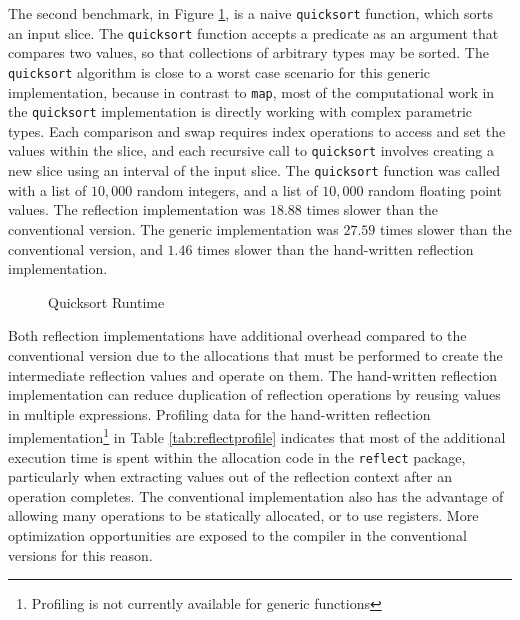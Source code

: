 \documentclass[letterpaper,11pt]{article}
\begin{document}
The second benchmark, in Figure \ref{fig:quicksort}, is a naive \texttt{quicksort} function, which sorts an input slice. The \texttt{quicksort} function accepts a predicate as an argument that compares two values, so that collections of arbitrary types may be sorted. The \texttt{quicksort} algorithm is close to a worst case scenario for this generic implementation, because in contrast to \texttt{map}, most of the computational work in the \texttt{quicksort} implementation is directly working with complex parametric types. Each comparison and swap requires index operations to access and set the values within the slice, and each recursive call to \texttt{quicksort} involves creating a new slice using an interval of the input slice. The \texttt{quicksort} function was called with a list of $10,000$ random integers, and a list of $10,000$ random floating point values. The reflection implementation was $18.88$ times slower than the conventional version. The generic implementation was $27.59$ times slower than the conventional version, and $1.46$ times slower than the hand-written reflection implementation.

\begin{figure}
    \caption{Quicksort Runtime\label{fig:quicksort}}
    \centering
    
\end{figure}

Both reflection implementations have additional overhead compared to the conventional version due to the allocations that must be performed to create the intermediate reflection values and operate on them. The hand-written reflection implementation can reduce duplication of reflection operations by reusing values in multiple expressions. Profiling data for the hand-written reflection implementation\footnote{Profiling is not currently available for generic functions} in Table \ref{tab:reflectprofile} indicates that most of the additional execution time is spent within the allocation code in the \texttt{reflect} package, particularly when extracting values out of the reflection context after an operation completes.  The conventional implementation also has the advantage of allowing many operations to be statically allocated, or to use registers. More optimization opportunities are exposed to the compiler in the conventional versions for this reason.
\end{document}
